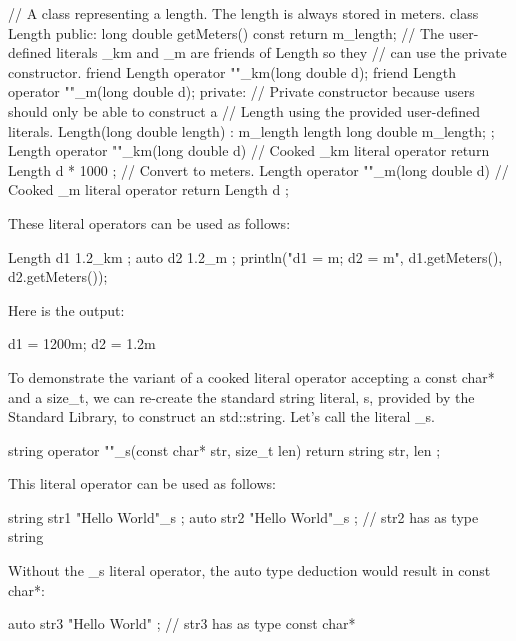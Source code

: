\begin{cpp}
// A class representing a length. The length is always stored in meters.
class Length
{
    public:
        long double getMeters() const { return m_length; }
        // The user-defined literals _km and _m are friends of Length so they
        // can use the private constructor.
        friend Length operator ""_km(long double d);
        friend Length operator ""_m(long double d);
    private:
        // Private constructor because users should only be able to construct a
        // Length using the provided user-defined literals.
        Length(long double length) : m_length { length } {}
        long double m_length;
};
Length operator ""_km(long double d) // Cooked _km literal operator
{
    return Length { d * 1000 }; // Convert to meters.
}
Length operator ""_m(long double d) // Cooked _m literal operator
{
    return Length { d };
}
\end{cpp}

These literal operators can be used as follows:

\begin{cpp}
Length d1 { 1.2_km };
auto d2 { 1.2_m };
println("d1 = {}m; d2 = {}m", d1.getMeters(), d2.getMeters());
\end{cpp}

Here is the output:

\begin{shell}
d1 = 1200m; d2 = 1.2m
\end{shell}

To demonstrate the variant of a cooked literal operator accepting a const char* and a size\_t, we can re-create the standard string literal, s, provided by the Standard Library, to construct an std::string. Let’s call the literal \_s.

\begin{cpp}
string operator ""_s(const char* str, size_t len)
{
    return string { str, len };
}
\end{cpp}

This literal operator can be used as follows:

\begin{cpp}
string str1 { "Hello World"_s };
auto str2 { "Hello World"_s }; // str2 has as type string
\end{cpp}

Without the \_s literal operator, the auto type deduction would result in const char*:

\begin{cpp}
auto str3 { "Hello World" }; // str3 has as type const char*
\end{cpp}


